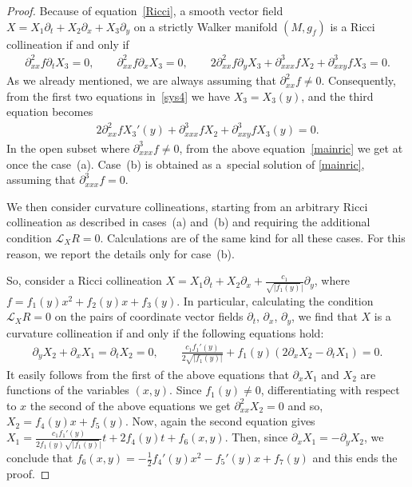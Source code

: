 \documentclass[10pt,a4paper]{amsart}
\numberwithin{equation}{section}
\begin{document}
\begin{proof}
Because of equation~\eqref{Ricci}, a smooth vector f\/ield $X=X_1\partial_t+X_2\partial_x+X_3\partial_y$ on a strictly Walker manifold $(M,g_f)$ is a Ricci collineation if and only if
\begin{gather}\label{sys4}
 \partial_{xx}^2f \partial_tX_3=0,\qquad \partial_{xx}^2f\partial_xX_3=0,\qquad
 2\partial_{xx}^2f\partial_yX_3+ \partial_{xxx}^3f X_2+ \partial_{xxy}^3f X_3=0.
\end{gather}
As we already mentioned, we are always assuming that $\partial_{xx}^2f\neq 0$. Consequently, from the f\/irst two equations in~\eqref{sys4} we have $X_3=X_3(y)$, and the third equation becomes
\begin{gather}\label{mainric}
2\partial_{xx}^2f X_3 '(y)+\partial_{xxx}^3f X_2+\partial_{xxy}^3f X_3(y)=0.
\end{gather}
In the open subset where $\partial_{xxx}^3f \neq 0$, from the above equation~\eqref{mainric} we get at once the case~(a). Case~(b) is obtained as a~special solution of \eqref{mainric}, assuming that $\partial_{xxx}^3f =0$.

We then consider curvature collineations, starting from an arbitrary Ricci collineation as described in cases~(a) and~(b) and requiring the additional condition $\mathcal{L}_X R=0$. Calculations are of the same kind for all these cases. For this reason, we report the details only for case~(b).

So, consider a Ricci collineation $X=X_1\partial_t+X_2\partial_x+\frac{c_1}{\sqrt{|f_1(y)}|}\partial_y$, where $f=f_1(y)x^2+f_2(y)x+f_3(y)$. In particular, calculating the condition $\mathcal{L}_X R=0$ on the pairs of coordinate vector f\/ields $\partial_t$, $\partial_x$, $\partial_y$, we f\/ind that $X$ is a curvature collineation if and only if the following equations hold:
\begin{gather*}
\partial_yX_2+\partial_xX_1=\partial_tX_2=0,\qquad \frac{c_1f_1 '(y)}{2\sqrt{|f_1(y)|}}+f_1(y)\left(2\partial_xX_2-\partial_tX_1\right)=0.
\end{gather*}
It easily follows from the f\/irst of the above equations that $\partial_xX_1$ and $X_2$ are functions of the variables $(x,y)$. Since $f_1(y)\neq 0$, dif\/ferentiating with respect to $x$ the second of the above equations we get $\partial_{xx}^2X_2=0$ and so, $X_2=f_4(y)x+f_5(y)$. Now, again the second equation gives $X_1=\frac{c_1f_1 '(y)}{2f_1(y)\sqrt{|f_1(y)}|}t+2f_4(y)t+f_6(x,y)$. Then, since $\partial_xX_1=-\partial_yX_2$, we conclude that $f_6(x,y)=-\frac12f_4 '(y) x^2-f_5 '(y) x+f_7(y)$ and this ends the proof.
\end{proof}
\end{document}
